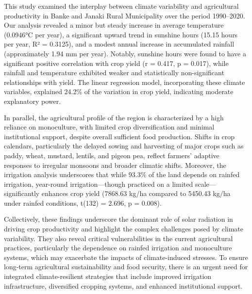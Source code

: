 

This study examined the interplay between climate variability and agricultural productivity in Banke and Janaki Rural Municipality over the period 1990–2020. Our analysis revealed a minor but steady increase in average temperature (0.0946°C per year), a significant upward trend in sunshine hours (15.15 hours per year, R² = 0.3125), and a modest annual increase in accumulated rainfall (approximately 1.94 mm per year). Notably, sunshine hours were found to have a significant positive correlation with crop yield (r = 0.417, p = 0.017), while rainfall and temperature exhibited weaker and statistically non-significant relationships with yield. The linear regression model, incorporating these climate variables, explained 24.2\% of the variation in crop yield, indicating moderate explanatory power.

In parallel, the agricultural profile of the region is characterized by a high reliance on monoculture, with limited crop diversification and minimal institutional support, despite overall sufficient food production. Shifts in crop calendars, particularly the delayed sowing and harvesting of major crops such as paddy, wheat, mustard, lentils, and pigeon pea, reflect farmers' adaptive responses to irregular monsoons and broader climatic shifts. Moreover, the irrigation analysis underscores that while 93.3\% of the land depends on rainfed irrigation, year-round irrigation—though practiced on a limited scale—significantly enhances crop yield (7868.63 kg/ha compared to 5450.43 kg/ha under rainfed conditions, t(132) = 2.696, p = 0.008).

Collectively, these findings underscore the dominant role of solar radiation in driving crop productivity and highlight the complex challenges posed by climate variability. They also reveal critical vulnerabilities in the current agricultural practices, particularly the dependence on rainfed irrigation and monoculture systems, which may exacerbate the impacts of climate-induced stresses. To ensure long-term agricultural sustainability and food security, there is an urgent need for integrated climate-resilient strategies that include improved irrigation infrastructure, diversified cropping systems, and enhanced institutional support.
